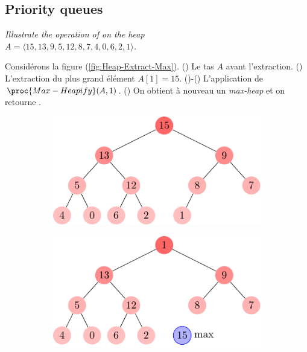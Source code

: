 \subsection{Priority queues}

\begin{description}
     \textit{Illustrate the operation of  on the heap \\$A = \langle 15, 13, 9, 5, 12, 8, 7, 4, 0, 6, 2,1 \rangle$.}
        \begin{ex}
          Consid\'erons la figure (\ref{fig:Heap-Extract-Max}). () Le tas $A$ avant l'extraction. () L'extraction du plus grand \'el\'ement $A[1]=15$. ()-() L'application de $\proc{Max-Heapify}(A,1)$. () On obtient \`a nouveau un \textit{max-heap} et on retourne .
      \begin{figure}[H]
        \centering
        \begin{subfigure}[t]{.40\textwidth}
          \centering
          \includegraphics[scale=0.8]{img/6_5-1/6_5-1_1}
          \caption{}\label{fig:6_5-1_1}
        \end{subfigure}
        \begin{subfigure}[t]{.40\textwidth}
          \centering
          \includegraphics[scale=0.8]{img/6_5-1/6_5-1_2}
          \caption{}\label{fig:6_5-1_2}

\end{subfigure}
\end{figure}
\end{ex}
\end{description}
